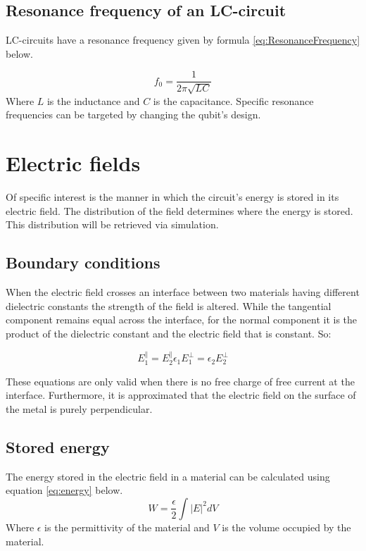 \subsection{Resonance frequency of an LC-circuit}
LC-circuits have a resonance frequency given by formula \eqref{eq:ResonanceFrequency} below.

\begin{equation} \label{eq:ResonanceFrequency}
f_{0}=\frac{1}{2\pi\sqrt{LC}}
\end{equation}
Where \(L\) is the inductance and \(C\) is the capacitance. Specific resonance frequencies can be targeted by changing the qubit's design.

\section{Electric fields}
Of specific interest is the manner in which the circuit's energy is stored in its electric field. The distribution of the field determines where the energy is stored. This distribution will be retrieved via simulation. 

\subsection{Boundary conditions}
When the electric field crosses an interface between two materials having different dielectric constants the strength of the field is altered. While the tangential component remains equal across the interface, for the normal component it is the product of the dielectric constant and the electric field that is constant. So:

\begin{subequations}\label{eq:ContinuityEq}
	\begin{equation} \label{eq:ContinuityEqA}
	E_{1}^{\parallel} = E_{2}^{\parallel}
	\end{equation}	
	\begin{equation} \label{eq:ContinuityEqB}
	\epsilon_{1}E_{1}^{\bot} = \epsilon_{2}E_{2}^{\bot}
	\end{equation}
\end{subequations}

These equations are only valid when there is no free charge of free current at the interface.
Furthermore, it is approximated that the electric field on the surface of the metal is purely perpendicular.
\subsection{Stored energy}
The energy stored in the electric field in a material can be calculated using equation \eqref{eq:energy} below.
\begin{equation} \label{eq:energy}
W = \frac{\epsilon}{2}\int{|E|}^{2}dV
\end{equation}
Where \(\epsilon\) is the permittivity of the material and \(V\) is the volume occupied by the material. 

